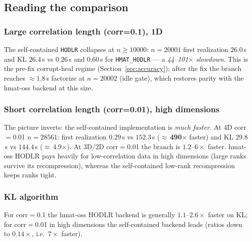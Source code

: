 \documentclass[11pt,a4paper]{article}
\begin{document}
\subsection{Reading the comparison}
\subsubsection*{Large correlation length (corr=0.1), 1D}
The self-contained \texttt{HODLR} collapses at $n\ge 10000$:
$n=20001$ first realization $26.0$\,s and KL $26.4$\,s vs $0.26$\,s and $0.60$\,s
for \texttt{HMAT\_HODLR} --- a \emph{44--101$\times$ slowdown}. This is the
pre-fix corrupt-heal regime (Section~\ref{sec:accuracy}); after the fix the
branch reaches $\approx 1.8$\,s factorize at $n=20002$ (idle gate), which
restores parity with the hmat-oss backend at this size.
\subsubsection*{Short correlation length (corr=0.01), high dimensions}
The picture inverts: the self-contained implementation is \emph{much faster}.
At 4D corr$=$0.01 $n=28561$: first realization $0.29$\,s vs $152.3$\,s
($\approx$\,\textbf{490$\times$} faster) and KL $29.8$\,s vs $144.4$\,s
($\approx$\,4.9$\times$). At 3D/2D corr$=$0.01 the branch is $1.2$--$6\times$
faster.  hmat-oss HODLR pays heavily for low-correlation data in high
dimensions (large ranks survive its recompression), whereas the self-contained
low-rank recompression keeps ranks tight.
\subsubsection*{KL algorithm}
For corr$=$0.1 the hmat-oss HODLR backend is generally $1.1$--$2.6\times$ faster
on KL; for corr$=$0.01 in high dimensions the self-contained backend leads
(ratios down to $0.14\times$, i.e.\ $7\times$ faster).
\end{document}
